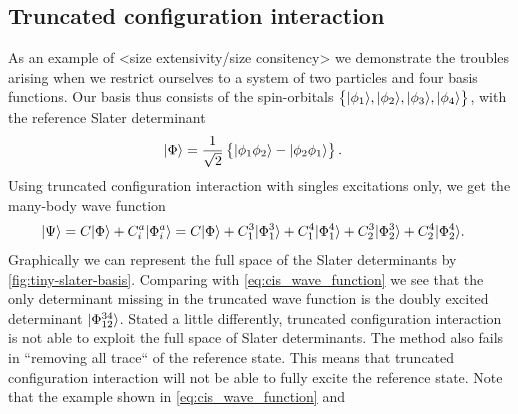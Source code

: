         \subsection{Truncated configuration interaction}
            As an example of <size extensivity/size consitency> we demonstrate
            the troubles arising when we restrict ourselves to a system of two
            particles and four basis functions.
            Our basis thus consists of the spin-orbitals $\left\{ | \phi_1 \rangle,
            | \phi_2 \rangle, | \phi_3 \rangle, | \phi_4 \rangle \right\}$, with the reference
            Slater determinant
            \begin{align}
                | \Phi \rangle
                &= \frac{1}{\sqrt{2}}\left\{ 
                    | \phi_1\phi_2 \rangle
                    - | \phi_2\phi_1 \rangle
                 \right\}.
            \end{align}
            Using truncated configuration interaction with singles excitations
            only, we get the many-body wave function
            \begin{align}
                | \Psi \rangle
                &= C| \Phi \rangle
                + C^{a}_{i}| \Phi^{a}_{i} \rangle
                = C| \Phi \rangle
                + C^{3}_{1}| \Phi^{3}_{1} \rangle
                + C^{4}_{1}| \Phi^{4}_{1} \rangle
                + C^{3}_{2}| \Phi^{3}_{2} \rangle
                + C^{4}_{2}| \Phi^{4}_{2} \rangle.
                \label{eq:cis_wave_function}
            \end{align}
            Graphically we can represent the full space of the Slater determinants
            by \autoref{fig:tiny-slater-basis}.
            Comparing with \autoref{eq:cis_wave_function} we see that the only
            determinant missing in the truncated wave function is the doubly
            excited determinant $| \Phi^{34}_{12} \rangle$.
            Stated a little differently, truncated configuration interaction is
            not able to exploit the full space of Slater determinants.
            The method also fails in ``removing all trace`` of the reference
            state.
            This means that truncated configuration interaction will not be able
            to fully excite the reference state.
            Note that the example shown in \autoref{eq:cis_wave_function} and
